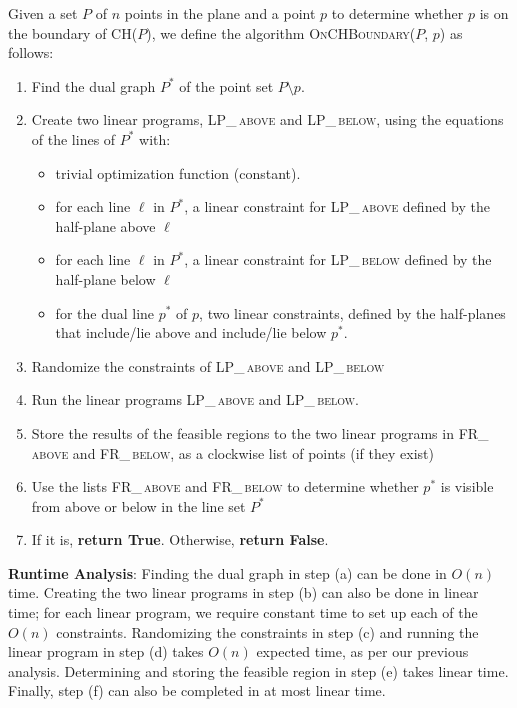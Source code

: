 \documentclass[11pt]{article}
\begin{document}
\begin{enumerate}
Given a set $P$ of $n$ points in the plane and a point $p$ to determine whether $p$ is on the boundary of CH($P$), we define the algorithm \textsc{OnCHBoundary}($P$, $p$) as follows:
\begin{enumerate}
    \item Find the dual graph $P^*$ of the point set $P \setminus p$.
    \item Create two linear programs, \textsc{LP\_\,above} and \textsc{LP\_\,below}, using the equations of the lines of $P^*$ with:
        \begin{itemize}
        \item trivial optimization function (constant).
        \item for each line $\ell$ in $P^*$, a linear constraint for \textsc{LP\_\,above} defined by the half-plane above $\ell$
        \item for each line $\ell$ in $P^*$, a linear constraint for \textsc{LP\_\,below} defined by the half-plane below $\ell$
        \item for the dual line $p^*$ of $p$, two linear constraints, defined by the half-planes that include/lie above and include/lie below $p^*$.
        \end{itemize}
    \item Randomize the constraints of \textsc{LP\_\,above} and \textsc{LP\_\,below}
    \item Run the linear programs \textsc{LP\_\,above} and \textsc{LP\_\,below}.
    \item Store the results of the feasible regions to the two linear programs in \textsc{FR\_\,above} and \textsc{FR\_\,below}, as a clockwise list of points (if they exist)
    \item Use the lists \textsc{FR\_\,above} and \textsc{FR\_\,below} to determine whether $p^*$ is visible from above or below in the line set $P^*$
    \item If it is, \textbf{return True}. Otherwise, \textbf{return False}.
\end{enumerate}

\textbf{Runtime Analysis}: Finding the dual graph in step (a) can be done in $O(n)$ time. Creating the two linear programs in step (b) can also be done in linear time; for each linear program, we require constant time to set up each of the $O(n)$ constraints. Randomizing the constraints in step (c) and running the linear program in step (d) takes $O(n)$ expected time, as per our previous analysis. Determining and storing the feasible region in step (e) takes linear time. Finally, step (f) can also be completed in at most linear time. \\


\end{enumerate}
\end{document}
